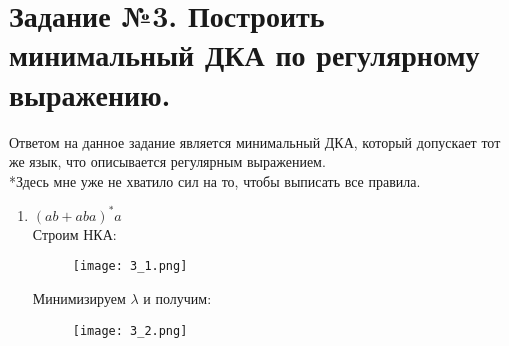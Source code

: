 \documentclass[12pt, a4paper]{article}
\begin{document}
\section{Задание №3. Построить минимальный ДКА по регулярному выражению.}
Ответом на данное задание является минимальный ДКА, который допускает тот же язык, что описывается регулярным выражением.
\\*Здесь мне уже не хватило сил на то, чтобы выписать все правила.
\begin{enumerate}
    \item \((ab+aba)^*a\)
\\Строим НКА:
\begin{comment}
digraph {
    rankdir="LR"
    "" [shape=point]
    q1 [shape=circle]
    q2 [shape=circle]
    q3 [shape=circle]
    q4 [shape=circle]
    q5 [shape=circle]
    q6 [shape=circle]
    q7 [shape=circle]
    q8 [shape=circle]
    q9 [shape=circle]
    q10 [shape=circle]
    q11 [shape=circle]
    q12 [shape=doublecircle]

    "" -> q1 
    q1 -> q2 [label="λ"]
    q2 -> q3 [label="λ"]
    q3 -> q4 [label="a"]
    q4 -> q5 [label="b"]
    q5 -> q6 [label="λ"]
    q2 -> q7 [label="λ"]
    q7 -> q8 [label="a"]
    q8 -> q9 [label="b"]
    q9 -> q10 [label="a"]
    q10 -> q6 [label="λ"]
    q6 -> q11 [label="λ"]
    q11 -> q12 [label="a"]
    q6 -> q2 [label="λ"]
    q1 -> q11 [label="λ"]
}
\end{comment}
    \begin{figure}[H]
        \centering
        \texttt{[image: 3\_1.png]}
    \end{figure}
Минимизируем \(\lambda\) и получим:
\begin{comment}
digraph {
    rankdir="LR"
    "" [shape=point]
    q1 [shape=circle]
    q2 [shape=circle]
    q3 [shape=circle]
    q4 [shape=circle]
    q5 [shape=circle]
    q6 [shape=circle]
    q7 [shape=circle]
    q8 [shape=circle]
    q9 [shape=circle]
    q10 [shape=doublecircle]

    "" -> q1 
    q1 -> q2 [label="λ"]
    q2 -> q3 [label="a"]
    q3 -> q4 [label="b"]
    q4 -> q5 [label="λ"]
    q1 -> q6 [label="λ"]
    q6 -> q7 [label="a"]
    q7 -> q8 [label="b"]
    q8 -> q9 [label="a"]
    q9 -> q5 [label="λ"]
    q5 -> q10 [label="a"]
    q5 -> q1 [label="λ"]
    q1 -> q5 [label="λ"]
}
\end{comment}
    \begin{figure}[H]
        \centering
        \texttt{[image: 3\_2.png]}
    \end{figure}
    

\end{enumerate}
\end{document}
